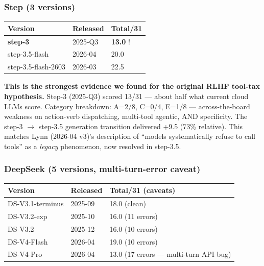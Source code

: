 \documentclass[11pt]{article}
\newcounter{none}
\begin{document}
\subsubsection{Step (3 versions)}\label{sec:step-3-versions}

{\def\LTcaptype{none} %
\begin{longtable}[]{@{}lll@{}}
\toprule\noalign{}
Version & Released & Total/31 \\
\midrule\noalign{}
\endhead
\bottomrule\noalign{}
\endlastfoot
\textbf{step-3} & 2025-Q3 & \textbf{13.0} !️ \\
step-3.5-flash & 2026-04 & 20.0 \\
step-3.5-flash-2603 & 2026-03 & 22.5 \\
\end{longtable}
}

\textbf{This is the strongest evidence we found for the original RLHF
tool-tax hypothesis.} Step-3 (2025-Q3) scored 13/31 --- about half what
current cloud LLMs score. Category breakdown: A=2/8, C=0/4, E=1/8 ---
across-the-board weakness on action-verb dispatching, multi-tool
agentic, AND specificity. The step-3 $\rightarrow$ step-3.5 generation transition
delivered +9.5 (73\% relative). This matches Lynn (2026-04 v3)'s
description of ``models systematically refuse to call tools'' as a
\emph{legacy} phenomenon, now resolved in step-3.5.

\subsubsection{DeepSeek (5 versions, multi-turn-error
caveat)}\label{sec:deepseek-5-versions-multi-turn-error-caveat}

{\def\LTcaptype{none} %
\begin{longtable}[]{@{}lll@{}}
\toprule\noalign{}
Version & Released & Total/31 (caveats) \\
\midrule\noalign{}
\endhead
\bottomrule\noalign{}
\endlastfoot
DS-V3.1-terminus & 2025-09 & 18.0 (clean) \\
DS-V3.2-exp & 2025-10 & 16.0 (11 errors) \\
DS-V3.2 & 2025-12 & 16.0 (10 errors) \\
DS-V4-Flash & 2026-04 & 19.0 (10 errors) \\
DS-V4-Pro & 2026-04 & 13.0 (17 errors --- multi-turn API bug) \\
\end{longtable}
}
\end{document}
